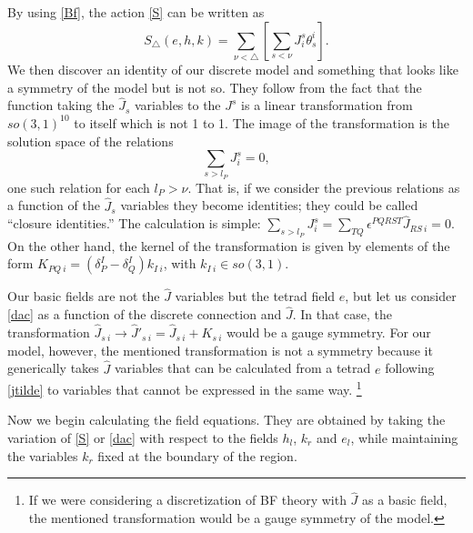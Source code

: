 \documentclass{article}
\begin{document}
By using \eqref{Bf}, the action \eqref{S} can be written as
\begin{equation}\label{dac}
	S_{\triangle}(e, h, k)=\sum_{\nu<\triangle}\left[\sum_{s<\nu} J^s_{i}\theta_{s}^{i}\right].
\end{equation}	
%
We then discover an identity of our discrete model and something that looks like a symmetry of the model but is not so. 
They follow from the fact that the function taking the $\hat{J}_s$ variables to the $J^{s}$ is a linear transformation from $so(3,1)^{10}$ to itself which is not 1 to 1. The image of the transformation is the solution space of the relations 
\begin{equation}\label{closure}
	\sum_{s >l_P} J^s_{i} = 0 , 
\end{equation}
one such relation for each $l_P>\nu$. 
That is, if we consider the previous relations as a function of the $\hat{J}_s$ variables they become identities; they could be called  ``closure identities.'' The calculation is simple: $\sum_{s >l_P} J^s_{i} = 
	\sum_{TQ} \epsilon^{PQRST} \hat{J}_{{RS}~i} = 0$. 
On the other hand, the kernel of the transformation is given by elements of the form $K_{PQ~i}=\left(\delta_{P}^{I}-\delta_{Q}^{I}\right)k_{I~i}$, with $k_{I~i}\in so(3,1)$. 

Our basic fields are not the $\hat{J}$ variables but the tetrad field $e$, but let us consider \eqref{dac} as a function of the discrete connection and $\hat{J}$. In that case, the transformation $\hat{J}_{s~i}\rightarrow \hat{J}'_{s~i} = \hat{J}_{s~i}+K_{s~i}$ would be a gauge symmetry. 
For our model, however, the mentioned transformation is not a symmetry because it generically takes $\hat{J}$ variables that can be calculated from a tetrad $e$ following \eqref{jtilde} to variables that cannot be expressed in the same way.%
\footnote{If we were considering a discretization of BF theory with $\hat{J}$ as a basic field, the mentioned transformation would be a gauge symmetry of the model.}  

Now we begin calculating the field equations. They are obtained by taking the variation of \eqref{S} or \eqref{dac} with respect to the fields $h_{l}$, $k_{r}$ and $e_{l}$, while maintaining the variables $k_{r}$ fixed at the boundary of the region.
\end{document}
